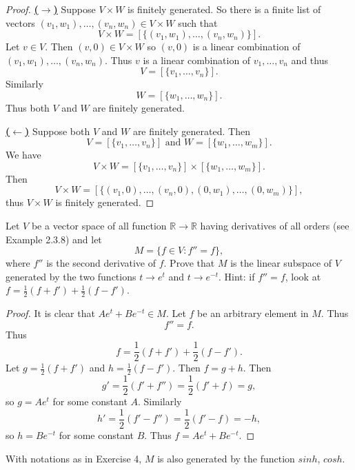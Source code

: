 \begin{proof}
    \underline{\textbf{($\longrightarrow$)}}
    Suppose $V \times W$ is finitely generated.
    So there is a finite list of vectors 
    $(v_1,w_1), \ldots, (v_n,w_n) \in V \times W$ such that 
    \[
    V \times W = [\{(v_1,w_1), \ldots, (v_n,w_n)\}].
    \]
    Let $v \in V$. Then $(v,0) \in V \times W$ so 
    $(v,0)$ is a linear combination of 
    $(v_1,w_1), \ldots, (v_n,w_n)$. Thus 
    $v$ is a linear combination of $v_1,\ldots,v_n$ and thus
    \[
    V=[\{v_1,\ldots,v_n\}].
    \]
    Similarly
    \[
    W=[\{w_1,\ldots,w_n\}].
    \]
    Thus both $V$ and $W$ are finitely generated.

    \underline{\textbf{($\longleftarrow$)}}
    Suppose both $V$ and $W$ are finitely generated. Then 
    \[
    V = [\{v_1, \ldots, v_n\}] \text{ and } W = [\{w_1, \ldots, w_m\}].
    \]
    We have 
    \[
    V \times W = [\{v_1, \ldots, v_n\}] \times [\{w_1, \ldots, w_m\}].
    \]
    Then
    \[
    V \times W
    =
    [\{(v_1,0),\ldots,(v_n,0),(0,w_1),\ldots,(0,w_m)\}],
    \]
    thus $V \times W$ is finitely generated.
\end{proof}


\begin{tcolorbox}[title=Problem 4, breakable]
    Let $V$ be a vector space of all function 
    $\mathbb{R} \longrightarrow \mathbb{R}$ having 
    derivatives of all orders (see Example 2.3.8) and let 
    \[M = \{f \in V : f'' = f\},\]
    where $f''$ is the second derivative of $f$.
    Prove that $M$ is the linear subspace of $V$ generated 
    by the two functions $t \longrightarrow e^t$ and $t \longrightarrow e^{-t}$.
    {Hint: if $f'' = f$, look at $f = \frac{1}{2}(f + f') + \frac{1}{2}(f - f')$.}
\end{tcolorbox}

\begin{proof}
    It is clear that $A e^t + B e^{-t} \in M$.
    Let $f$ be an arbitrary element in $M$.
    Thus 
    \[f'' = f.\]
    Thus 
    \[f = \frac{1}{2}(f + f') + \frac{1}{2}(f - f').\]
    Let $g = \frac{1}{2}(f + f')$ and $h =  \frac{1}{2}(f - f')$.
    Then $f = g + h$.
    Then 
    \[g' = \frac{1}{2}(f' + f'') = \frac{1}{2}(f' + f) = g,\]
    so $g = A e^t$ for some constant $A$.
    Similarly
    \[h' = \frac{1}{2}(f' - f'') = \frac{1}{2}(f' - f) = -h,\]
    so $h = B e^{-t}$ for some constant $B$.
    Thus $f = A e^t + B e^{-t}$.
\end{proof}

\begin{tcolorbox}[title=Problem 5, breakable]
    With notations as in Exercise 4, $M$ is also generated 
    by the function $sinh$, $cosh$.
\end{tcolorbox}

